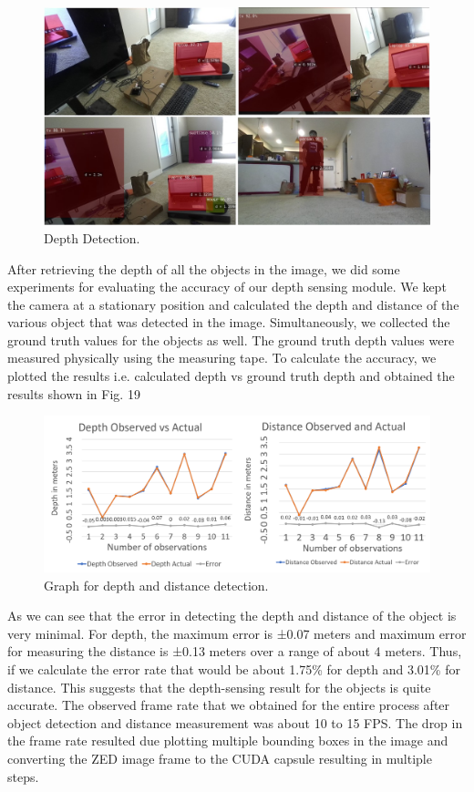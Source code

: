 \documentclass{IEEEtran}
\begin{document}
\begin{figure}[htb]
\centering
\includegraphics[width=1\linewidth]{fig/depth_jay.jpg}
\caption{Depth Detection.} \label{fig.structure}
\end{figure}

After retrieving the depth of all the objects in the image, we did some experiments for evaluating the accuracy of our depth sensing module. We kept the camera at a stationary position and calculated the depth and distance of the various object that was detected in the image. Simultaneously, we collected the ground truth values for the objects as well. The ground truth depth values were measured physically using the measuring tape. To calculate the accuracy, we plotted the results i.e. calculated depth vs ground truth depth and obtained the results shown in Fig. 19

\begin{figure}[htb]
\centering
\includegraphics[width=1\linewidth]{fig/jay_graph.png}
\caption{Graph for depth and distance detection.} \label{fig.structure}
\end{figure}

As we can see that the error in detecting the depth and distance of the object is very minimal. For depth, the maximum error is ±0.07 meters and maximum error for measuring the distance is ±0.13 meters over a range of about 4 meters. Thus, if we calculate the error rate that would be about 1.75{\%} for depth and 3.01{\%} for distance. This suggests that the depth-sensing result for the objects is quite accurate. The observed frame rate that we obtained for the entire process after object detection and distance measurement was about 10 to 15 FPS. The drop in the frame rate resulted due plotting multiple bounding boxes in the image and converting the ZED image frame to the CUDA capsule resulting in multiple steps.
\end{document}
